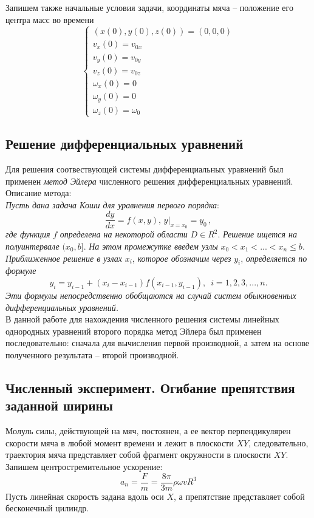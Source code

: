 \documentclass[a5paper, 10pt]{article}
\theoremstyle{definition}
\theoremstyle{plain}
\theoremstyle{remark}
\begin{document}
Запишем также начальные условия задачи, координаты мяча -- положение его центра масс во времени
\begin{equation}
\begin{cases}
\left(x (0), y(0), z(0) \right)  = \left(0, 0, 0\right)\\
v_{x} (0) = v_{0x}\\
v_{y} (0) = v_{0y}\\
v_{z} (0) = v_{0z}\\
\omega_{x} (0) = 0\\
\omega_{y} (0) = 0\\
\omega_{z} (0) = \omega_{0}
\end{cases}
\end{equation}
\subsection{Решение дифференциальных уравнений}
Для решения соотвествующей системы дифференциальных уравнений был применен \textit{метод Эйлера} численного решения дифференциальных уравнений. Описание метода:\\
\textit{Пусть дана задача Коши для уравнения первого порядка}:
$$ \frac{dy}{dx} = f(x, y), \, \left. y \right|_{x = x_0} = y_0 \, ,$$
\textit{где функция} $f$ \textit{определена на некоторой области} $D \in R^2$. \textit{Решение ищется на полуинтервале} $(x_0, b]$. \textit{На этом промежутке введем узлы} $x_0 < x_1 < ... < x_n \leq b$. \textit{Приближенное решение в узлах} $x_i$, \textit{которое обозначим через} $y_i$,  \textit{определяется по формуле}
$$y_i = y_{i-1} + (x_i - x_{i-1}) f(x_{i-1}, y_{i-1}), \, \, \, i = 1, 2, 3, ..., n.$$
\textit{Эти формулы непосредственно обобщаются на случай систем обыкновенных дифференциальных уравнений.}\\
В данной работе для нахождения численного решения системы линейных однородных уравнений второго порядка метод Эйлера был применен последовательно: сначала для вычисления первой производной, а затем на основе полученного результата -- второй производной.

\subsection{Численный эксперимент. Огибание препятствия заданной ширины}
Молуль силы, действующей на мяч, постоянен, а ее вектор перпендикулярен скорости мяча в любой момент времени и лежит в плоскости $XY$, следовательно, траектория мяча представляет собой фрагмент окружности в плоскости  $XY$. \\
Запишем центростремительное ускорение:
\begin{equation}
a_n = \frac{F}{m} = \frac{8\pi}{3m} \rho \omega v R^3
\end{equation}
Пусть линейная скорость задана вдоль оси $X$, а препятствие представляет собой бесконечный цилиндр.\\
\end{document}
